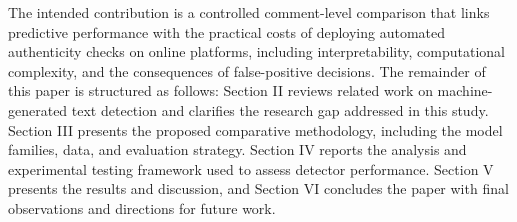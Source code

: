 \documentclass[conference]{IEEEtran}
\begin{document}
The intended contribution is a controlled comment-level comparison that links predictive performance with the practical costs of deploying automated authenticity checks on online platforms, including interpretability, computational complexity, and the consequences of false-positive decisions.
The remainder of this paper is structured as follows: Section II reviews related work on machine-generated text detection and clarifies the research gap addressed in this study. Section III presents the proposed comparative methodology, including the model families, data, and evaluation strategy. Section IV reports the analysis and experimental testing framework used to assess detector performance. Section V presents the results and discussion, and Section VI concludes the paper with final observations and directions for future work.


\end{document}
